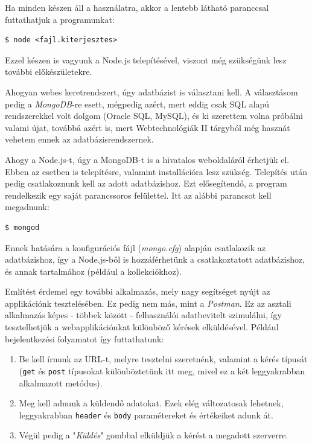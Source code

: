 Ha minden készen áll a használatra, akkor a lentebb látható paranccsal futtathatjuk a programunkat:

\begin{verbatim}
$ node <fajl.kiterjesztes>
\end{verbatim}

Ezzel készen is vagyunk a Node.js telepítésével, viszont még szükségünk lesz további előkészületekre.

Ahogyan webes keretrendszert, úgy adatbázist is választani kell. A választásom pedig a \textit{MongoDB}-re esett, mégpedig azért, mert eddig csak SQL alapú rendszerekkel volt dolgom (Oracle SQL, MySQL), és ki szerettem volna próbálni valami újat, továbbá azért is, mert Webtechnológiák II tárgyból még hasznát vehetem ennek az adatbázisrendszernek.

Ahogy a Node.js-t, úgy a MongoDB-t is a hivatalos weboldaláról érhetjük el. Ebben az esetben is telepítésre, valamint installációra lesz szükség. Telepítés után pedig csatlakoznunk kell az adott adatbázishoz. Ezt elősegítendő, a program rendelkezik egy saját parancssoros felülettel. Itt az alábbi parancsot kell megadnunk:

\begin{verbatim}
$ mongod
\end{verbatim}

Ennek hatására a konfigurációs fájl (\textit{mongo.cfg}) alapján csatlakozik az adatbázishoz, így a Node.js-ből is hozzáférhetünk a csatlakoztatott adatbázishoz, és annak tartalmához (például a kollekciókhoz).

Említést érdemel egy további alkalmazás, mely nagy segítséget nyújt az applikációnk tesztelésében. Ez pedig nem más, mint a \textit{Postman}. Ez az asztali alkalmazás képes - többek között - felhasználói adatbevitelt szimulálni, így tesztelhetjük a webapplikációnkat különböző kérések elküldésével. Például bejelentkezési folyamatot így  futtathatunk:

\begin{enumerate}
\item{Be kell írnunk az URL-t, melyre tesztelni szeretnénk, valamint a kérés típusát (\texttt{get} és \texttt{post} típusokat különböztetünk itt meg, mivel ez a két leggyakrabban alkalmazott metódus).}
\item{Meg kell adnunk a küldendő adatokat. Ezek elég változatosak lehetnek, leggyakrabban \texttt{header} és \texttt{body} paramétereket és értékeiket adunk át.}
\item{Végül pedig a "\textit{Küldés}" gombbal elküldjük a kérést a megadott szerverre.}
\end{enumerate}

